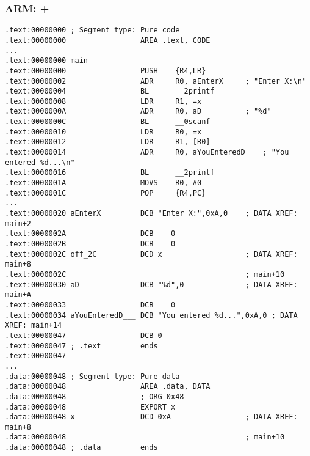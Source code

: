 ﻿\subsubsection{ARM: \OptimizingKeil + \ThumbMode}

\begin{lstlisting}
.text:00000000 ; Segment type: Pure code
.text:00000000                 AREA .text, CODE
...
.text:00000000 main
.text:00000000                 PUSH    {R4,LR}
.text:00000002                 ADR     R0, aEnterX     ; "Enter X:\n"
.text:00000004                 BL      __2printf
.text:00000008                 LDR     R1, =x
.text:0000000A                 ADR     R0, aD          ; "%d"
.text:0000000C                 BL      __0scanf
.text:00000010                 LDR     R0, =x
.text:00000012                 LDR     R1, [R0]
.text:00000014                 ADR     R0, aYouEnteredD___ ; "You entered %d...\n"
.text:00000016                 BL      __2printf
.text:0000001A                 MOVS    R0, #0
.text:0000001C                 POP     {R4,PC}
...
.text:00000020 aEnterX         DCB "Enter X:",0xA,0    ; DATA XREF: main+2
.text:0000002A                 DCB    0
.text:0000002B                 DCB    0
.text:0000002C off_2C          DCD x                   ; DATA XREF: main+8
.text:0000002C                                         ; main+10
.text:00000030 aD              DCB "%d",0              ; DATA XREF: main+A
.text:00000033                 DCB    0
.text:00000034 aYouEnteredD___ DCB "You entered %d...",0xA,0 ; DATA XREF: main+14
.text:00000047                 DCB 0
.text:00000047 ; .text         ends
.text:00000047
...
.data:00000048 ; Segment type: Pure data
.data:00000048                 AREA .data, DATA
.data:00000048                 ; ORG 0x48
.data:00000048                 EXPORT x
.data:00000048 x               DCD 0xA                 ; DATA XREF: main+8
.data:00000048                                         ; main+10
.data:00000048 ; .data         ends
\end{lstlisting}

